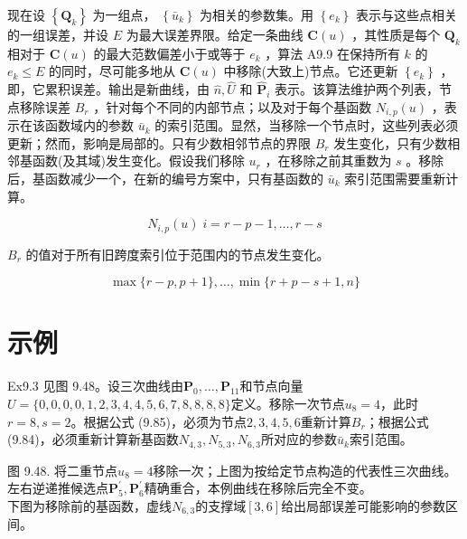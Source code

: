 \documentclass[../main.tex]{subfiles}
\begin{document}
现在设 \(\left\{  {\mathbf{Q}}_{k}\right\}\) 为一组点， \(\left\{  {\bar{u}}_{k}\right\}\) 为相关的参数集。用 \(\left\{  {e}_{k}\right\}\) 表示与这些点相关的一组误差，并设 \(E\) 为最大误差界限。给定一条曲线 \(\mathbf{C}\left( u\right)\) ，其性质是每个 \({\mathbf{Q}}_{k}\) 相对于 \(\mathbf{C}\left( u\right)\) 的最大范数偏差小于或等于 \({e}_{k}\) ，算法 A9.9 在保持所有 \(k\) 的 \({e}_{k} \leq  E\) 的同时，尽可能多地从 \(\mathbf{C}\left( u\right)\) 中移除(大致上)节点。它还更新 \(\left\{  {e}_{k}\right\}\) ，即，它累积误差。输出是新曲线，由 \(\widehat{n},\widehat{U}\) 和 \({\widehat{\mathbf{P}}}_{i}\) 表示。该算法维护两个列表，节点移除误差 \({B}_{r}\) ，针对每个不同的内部节点；以及对于每个基函数 \({N}_{i,p}\left( u\right)\) ，表示在该函数域内的参数 \({\bar{u}}_{k}\) 的索引范围。显然，当移除一个节点时，这些列表必须更新；然而，影响是局部的。只有少数相邻节点的界限 \({B}_{r}\) 发生变化，只有少数相邻基函数(及其域)发生变化。假设我们移除 \({u}_{r}\) ，在移除之前其重数为 \(s\) 。移除后，基函数减少一个，在新的编号方案中，只有基函数的 \({\bar{u}}_{k}\) 索引范围需要重新计算。

\[
{N}_{i,p}\left( u\right) \;i = r - p - 1,\ldots ,r - s \tag{9.84}
\]

\({B}_{r}\) 的值对于所有旧跨度索引位于范围内的节点发生变化。

\[
\max \{ r - p,p + 1\} ,\ldots ,\min \{ r + p - s + 1,n\}  \tag{9.85}
\]

\section*{示例}

Ex9.3 见图 9.48。设三次曲线由$\mathbf P_0,\ldots,\mathbf P_{11}$和节点向量$U=\{0,0,0,0,1,2,3,4,4,5,6,7,8,8,8,8\}$定义。移除一次节点$u_8=4$，此时$r=8,s=2$。根据公式 (9.85)，必须为节点$2,3,4,5,6$重新计算$B_r$；根据公式 (9.84)，必须重新计算新基函数$N_{4,3},N_{5,3},N_{6,3}$所对应的参数$\bar u_k$索引范围。

\begin{center}
\begin{minipage}{23cm}
\vspace*{.6\baselineskip}
\centering
{}
\par\smallskip
图 9.48. 将二重节点$u_8=4$移除一次；上图为按给定节点构造的代表性三次曲线。\\
左右逆递推候选点$\mathbf P^{\prime}_5,\mathbf P^{\prime}_6$精确重合，本例曲线在移除后完全不变。\\
下图为移除前的基函数，虚线$N_{6,3}$的支撑域$[3,6]$给出局部误差可能影响的参数区间。
\end{minipage}
\end{center}
\end{document}
